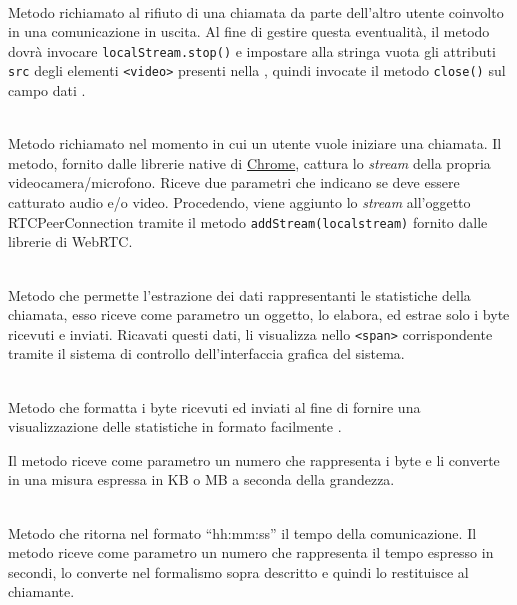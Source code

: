 \begin{description}
  \item{}\\
  Metodo richiamato al rifiuto di una chiamata da parte dell'altro utente coinvolto in una comunicazione in uscita. Al fine di gestire questa eventualità, il metodo dovrà invocare \verb'localStream.stop()' e impostare alla stringa vuota gli attributi \verb'src' degli elementi \verb'<video>' presenti nella , quindi invocate il metodo \verb'close()' sul campo dati .

  \item{}\\
  Metodo richiamato nel momento in cui un utente vuole iniziare una chiamata. Il metodo, fornito dalle librerie native di \underline{Chrome}, cattura lo \textit{stream} della propria videocamera/microfono. Riceve due parametri che indicano se deve essere catturato audio e/o video. Procedendo, viene aggiunto lo \textit{stream} all'oggetto RTCPeerConnection tramite il metodo \verb'addStream(localstream)' fornito dalle librerie di WebRTC\@.

  \item{}\\
  Metodo che permette l'estrazione dei dati rappresentanti le statistiche della chiamata, esso riceve come parametro un oggetto, lo elabora, ed estrae solo i byte ricevuti e inviati. Ricavati questi dati, li visualizza nello \verb'<span>' corrispondente tramite il sistema di controllo dell'interfaccia grafica del sistema.

  \item{}\\
  Metodo che formatta i byte ricevuti ed inviati al fine di fornire una visualizzazione delle statistiche in formato facilmente .
  
Il metodo riceve come parametro un numero che rappresenta i byte e li converte in una misura espressa in KB o MB a seconda della grandezza.

  \item{}\\
  Metodo che ritorna nel formato ``hh:mm:ss'' il tempo della comunicazione. Il metodo riceve come parametro un numero che rappresenta il tempo espresso in secondi, lo converte nel formalismo sopra descritto e quindi lo restituisce al chiamante.


\end{description}
